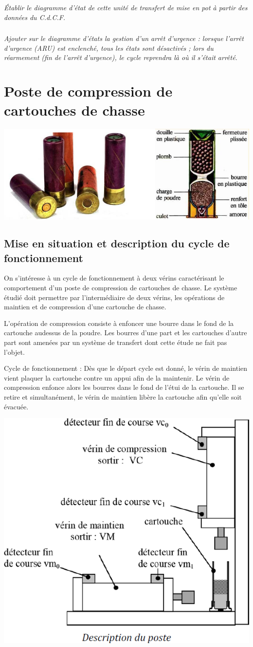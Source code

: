 \documentclass[10pt]{article}
\begin{document}
\subparagraph{}
\textit{Établir le diagramme d’état de cette unité de transfert de mise en pot à partir des
données du C.d.C.F.}

\subparagraph{}
\textit{Ajouter sur le diagramme d’états la gestion d’un arrêt d’urgence : lorsque l’arrêt d’urgence
(ARU) est enclenché, tous les états sont désactivés ; lors du réarmement (fin de l’arrêt
d’urgence), le cycle reprendra là où il s’était arrêté.}

\newpage 

\section*{Poste de compression de cartouches de chasse}
\begin{center}
\includegraphics[width=.5\textwidth]{images/fig_10}
\end{center}
\setcounter{subparagraph}{0}

\subsection*{Mise en situation et description du cycle de fonctionnement}

On s’intéresse à un cycle de fonctionnement à deux vérins caractérisant le comportement d’un
poste de compression de cartouches de chasse. Le système étudié doit permettre par
l’intermédiaire de deux vérins, les opérations de maintien et de compression d’une cartouche de
chasse.

L’opération de compression consiste à enfoncer une bourre dans le fond de la cartouche audessus
de la poudre. Les bourres d’une part et les cartouches d’autre part sont amenées par un
système de transfert dont cette étude ne fait pas l’objet.

Cycle de fonctionnement :
Dès que le départ cycle est donné, le vérin de maintien vient plaquer la cartouche contre un
appui afin de la maintenir. Le vérin de compression enfonce alors les bourres dans le fond de
l’étui de la cartouche. Il se retire et simultanément, le vérin de maintien libère la cartouche afin
qu’elle soit évacuée.

\begin{center}
\includegraphics[width=.5\textwidth]{images/fig_11}
\end{center}
\end{document}
